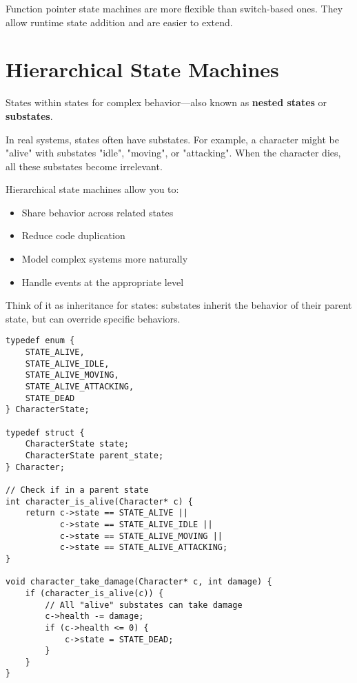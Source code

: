 \begin{notebox}
Function pointer state machines are more flexible than switch-based ones. They allow runtime state addition and are easier to extend.
\end{notebox}

\section{Hierarchical State Machines}

States within states for complex behavior---also known as \textbf{nested states} or \textbf{substates}.

In real systems, states often have substates. For example, a character might be "alive" with substates "idle", "moving", or "attacking". When the character dies, all these substates become irrelevant.

Hierarchical state machines allow you to:
\begin{itemize}
    \item Share behavior across related states
    \item Reduce code duplication
    \item Model complex systems more naturally
    \item Handle events at the appropriate level
\end{itemize}

Think of it as inheritance for states: substates inherit the behavior of their parent state, but can override specific behaviors.

\begin{lstlisting}
typedef enum {
    STATE_ALIVE,
    STATE_ALIVE_IDLE,
    STATE_ALIVE_MOVING,
    STATE_ALIVE_ATTACKING,
    STATE_DEAD
} CharacterState;

typedef struct {
    CharacterState state;
    CharacterState parent_state;
} Character;

// Check if in a parent state
int character_is_alive(Character* c) {
    return c->state == STATE_ALIVE ||
           c->state == STATE_ALIVE_IDLE ||
           c->state == STATE_ALIVE_MOVING ||
           c->state == STATE_ALIVE_ATTACKING;
}

void character_take_damage(Character* c, int damage) {
    if (character_is_alive(c)) {
        // All "alive" substates can take damage
        c->health -= damage;
        if (c->health <= 0) {
            c->state = STATE_DEAD;
        }
    }
}
\end{lstlisting}

